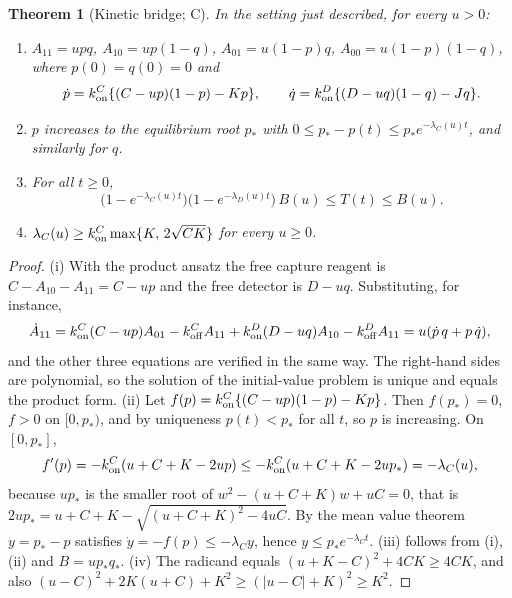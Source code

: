 \documentclass[11pt]{article}
\theoremstyle{plain}
\newtheorem{theorem}{Theorem}[section]
\theoremstyle{definition}
\numberwithin{equation}{section}
\newcommand{\Conv}{\textsf{C}}   %
\begin{document}
\begin{theorem}[Kinetic bridge; \Conv]\label{thm:kinetic}
In the setting just described, for every $u>0$:
\begin{enumerate}[label=(\roman*),leftmargin=2.2em,itemsep=1pt]
\item $A_{11}=upq$, $A_{10}=up(1-q)$, $A_{01}=u(1-p)q$, $A_{00}=u(1-p)(1-q)$, where
$p(0)=q(0)=0$ and
\[
 \dot p=k^C_{\rm on}\{(C-up)(1-p)-Kp\},\qquad
 \dot q=k^D_{\rm on}\{(D-uq)(1-q)-Jq\}.
\]
\item $p$ increases to the equilibrium root $p_*$ with
$0\le p_*-p(t)\le p_*e^{-\lambda_C(u)t}$, and similarly for $q$.
\item For all $t\ge0$,
\begin{equation}\label{eq:kinbound}
 \bigl(1-e^{-\lambda_C(u)t}\bigr)\bigl(1-e^{-\lambda_D(u)t}\bigr)\,B(u)\le T(t)\le B(u).
\end{equation}
\item $\lambda_C(u)\ge k^C_{\rm on}\max\{K,\,2\sqrt{CK}\}$ for every $u\ge0$.
\end{enumerate}
\end{theorem}
\begin{proof}
(i) With the product ansatz the free capture reagent is $C-A_{10}-A_{11}=C-up$ and
the free detector is $D-uq$. Substituting, for instance,
\[
 \dot A_{11}=k^C_{\rm on}(C-up)A_{01}-k^C_{\rm off}A_{11}
 +k^D_{\rm on}(D-uq)A_{10}-k^D_{\rm off}A_{11}=u(\dot p\,q+p\,\dot q),
\]
and the other three equations are verified in the same way. The right-hand sides are
polynomial, so the solution of the initial-value problem is unique and equals the
product form.
(ii) Let $f(p)=k^C_{\rm on}\{(C-up)(1-p)-Kp\}$. Then $f(p_*)=0$, $f>0$ on
$[0,p_*)$, and by uniqueness $p(t)<p_*$ for all $t$, so $p$ is increasing. On
$[0,p_*]$,
\[
 f'(p)=-k^C_{\rm on}(u+C+K-2up)\le-k^C_{\rm on}(u+C+K-2up_*)=-\lambda_C(u),
\]
because $up_*$ is the smaller root of $w^2-(u+C+K)w+uC=0$, that is
$2up_*=u+C+K-\sqrt{(u+C+K)^2-4uC}$. By the mean value theorem
$y=p_*-p$ satisfies $\dot y=-f(p)\le-\lambda_Cy$, hence $y\le p_*e^{-\lambda_Ct}$.
(iii) follows from (i), (ii) and $B=up_*q_*$.
(iv) The radicand equals $(u+K-C)^2+4CK\ge4CK$, and also
$(u-C)^2+2K(u+C)+K^2\ge(|u-C|+K)^2\ge K^2$.
\end{proof}
\end{document}
